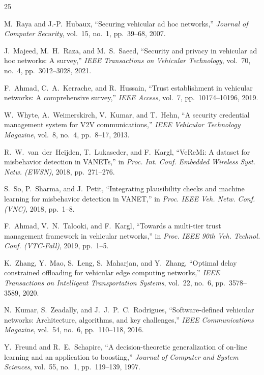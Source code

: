 \documentclass[conference]{IEEEtran}
\begin{document}
\begin{thebibliography}{25}

M.~Raya and J.-P.~Hubaux,
``Securing vehicular ad hoc networks,''
\textit{Journal of Computer Security}, vol.~15, no.~1, pp.~39--68, 2007.

J.~Majeed, M.~H.~Raza, and M.~S.~Saeed,
``Security and privacy in vehicular ad hoc networks: A survey,''
\textit{IEEE Transactions on Vehicular Technology}, vol.~70, no.~4, pp.~3012--3028, 2021.

F.~Ahmad, C.~A.~Kerrache, and R.~Hussain,
``Trust establishment in vehicular networks: A comprehensive survey,''
\textit{IEEE Access}, vol.~7, pp.~10174--10196, 2019.

W.~Whyte, A.~Weimerskirch, V.~Kumar, and T.~Hehn,
``A security credential management system for V2V communications,''
\textit{IEEE Vehicular Technology Magazine}, vol.~8, no.~4, pp.~8--17, 2013.

R.~W.~van~der~Heijden, T.~Lukaseder, and F.~Kargl,
``VeReMi: A dataset for misbehavior detection in VANETs,''
in \textit{Proc. Int. Conf. Embedded Wireless Syst. Netw. (EWSN)}, 2018, pp.~271--276.

S.~So, P.~Sharma, and J.~Petit,
``Integrating plausibility checks and machine learning for misbehavior detection in VANET,''
in \textit{Proc. IEEE Veh. Netw. Conf. (VNC)}, 2018, pp.~1--8.

F.~Ahmad, V.~N.~Talooki, and F.~Kargl,
``Towards a multi-tier trust management framework in vehicular networks,''
in \textit{Proc. IEEE 90th Veh. Technol. Conf. (VTC-Fall)}, 2019, pp.~1--5.

K.~Zhang, Y.~Mao, S.~Leng, S.~Maharjan, and Y.~Zhang,
``Optimal delay constrained offloading for vehicular edge computing networks,''
\textit{IEEE Transactions on Intelligent Transportation Systems}, vol.~22, no.~6, pp.~3578--3589, 2020.

N.~Kumar, S.~Zeadally, and J.~J.~P.~C.~Rodrigues,
``Software-defined vehicular networks: Architecture, algorithms, and key challenges,''
\textit{IEEE Communications Magazine}, vol.~54, no.~6, pp.~110--118, 2016.

Y.~Freund and R.~E.~Schapire,
``A decision-theoretic generalization of on-line learning and an application to boosting,''
\textit{Journal of Computer and System Sciences}, vol.~55, no.~1, pp.~119--139, 1997.


\end{thebibliography}
\end{document}
